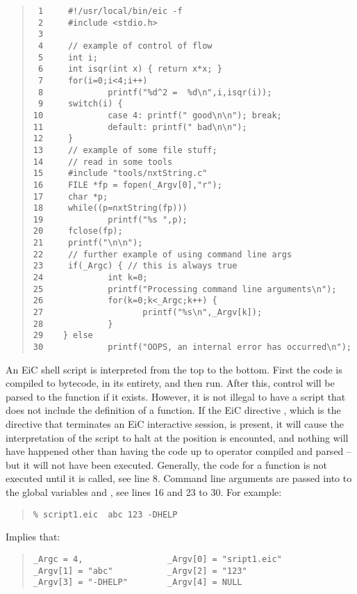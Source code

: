 \documentclass[12pt]{report}
\begin{document}
\begin{quote} 
\begin{verbatim}
 1     #!/usr/local/bin/eic -f 
 2     #include <stdio.h>
 3
 4     // example of control of flow
 5     int i;
 6     int isqr(int x) { return x*x; }
 7     for(i=0;i<4;i++)
 8             printf("%d^2 =  %d\n",i,isqr(i));
 9     switch(i) {
10             case 4: printf(" good\n\n"); break;
11             default: printf(" bad\n\n");
12     }
13     // example of some file stuff;
14     // read in some tools
15     #include "tools/nxtString.c"
16     FILE *fp = fopen(_Argv[0],"r");
17     char *p;
18     while((p=nxtString(fp)))
19             printf("%s ",p);
20     fclose(fp);
21     printf("\n\n");
22     // further example of using command line args
23     if(_Argc) { // this is always true
24             int k=0;
25             printf("Processing command line arguments\n");
26             for(k=0;k<_Argc;k++) {
27                    printf("%s\n",_Argv[k]);
28             }
29    } else
30             printf("OOPS, an internal error has occurred\n");
\end{verbatim}
\end{quote}

An EiC shell script is interpreted from the top to the bottom. First
the code is compiled to bytecode, in its entirety, and then run. After
this, control will be parsed to the  function if it
exists. However, it is not illegal to have a script that does not
include the definition of a  function. If the EiC directive
, which is the directive that terminates an EiC interactive
session, is present, it will cause the interpretation of the script to
halt at the position  is encounted, and nothing will have
happened other than having the code up to  operator compiled
and parsed -- but it will not have been executed.  Generally, the code
for a function is not executed until it is called, see line 8. Command
line arguments are passed into to the global variables  and
, see lines 16 and 23 to 30. For example:
\begin{quote}
\begin{verbatim}
% script1.eic  abc 123 -DHELP
\end{verbatim}
\end{quote}
Implies that:
\begin{quote} 
\begin{verbatim}
_Argc = 4,                 _Argv[0] = "sript1.eic"    
_Argv[1] = "abc"           _Argv[2] = "123"
_Argv[3] = "-DHELP"        _Argv[4] = NULL
\end{verbatim}
\end{quote}
\end{document}
